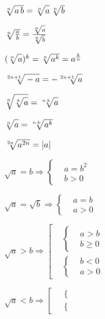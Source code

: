 $ \sqrt[n]{\mathstrut a\, b} = \sqrt[n]{\mathstrut a} \, \sqrt[n]{\mathstrut b} $

$ \sqrt[n]{\mathstrut \frac{a}{b}} = \frac{\sqrt[n]{\mathstrut a}}{\sqrt[n]{\mathstrut b}} $

$ (\sqrt[n]{\mathstrut a})^k = \sqrt[n]{\mathstrut a^k} = a^{\frac{k}{n}} $

$ \sqrt[2n + 1]{\mathstrut -a} = -\sqrt[2n + 1]{\mathstrut a} $

$ \sqrt[n]{\mathstrut \sqrt[k]{\mathstrut a}} = \sqrt[n\, k]{\mathstrut a} $

$ \sqrt[n]{\mathstrut a} = \sqrt[n\, k]{\mathstrut a^k} $

$ \sqrt[2n]{\mathstrut a^{2n}} = |a| $

$ \sqrt{a} = b \Rightarrow  \left\{ \begin{aligned}
	& a = b^2 \\
	& b > 0
\end{aligned}\right. $

$ \sqrt{a} = \sqrt{b} \Rightarrow  \left\{ \begin{aligned}
	& a = b \\
	& a > 0
\end{aligned}\right. $

$ \sqrt{a} > b \Rightarrow  \left[ \begin{aligned}
	& \left\{ \begin{aligned}
		& a > b \\
		& b \geqslant 0
	\end{aligned} \right. \\
	& \left\{ \begin{aligned}
		& b < 0 \\
		& a > 0
	\end{aligned} \right.
\end{aligned} \right. $

$ \sqrt{a} < b \Rightarrow  \left[ \begin{aligned}
	& \left\{ \begin{aligned}
		&  \\
		& 
	\end{aligned} \right. \\
	& \left\{ \begin{aligned}
		&  \\
		& 
	\end{aligned} \right.
\end{aligned} \right. $



